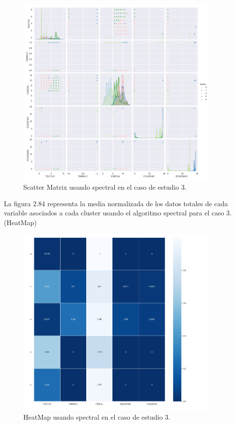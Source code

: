 	\begin{figure}[htb]
		\centering
		\includegraphics[width=0.9\textwidth]{./imagenes/caso3/scatterMatrix_caso3_spectral}
		\caption{Scatter Matrix usando spectral en el caso de estudio 3.} \label{fig:1}
	\end{figure}

	La figura 2.84 representa la media normalizada de los datos totales de cada variable asociados
	a cada cluster usando el algoritmo spectral para el caso 3. (HeatMap) \\

	\begin{figure}[htb]
		\centering
		\includegraphics[width=0.9\textwidth]{./imagenes/caso3/heatmap_caso3_spectral}
		\caption{HeatMap usando spectral en el caso de estudio 3.} \label{fig:1}
	\end{figure}

